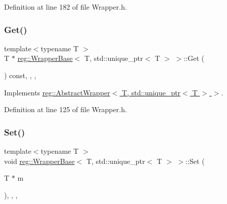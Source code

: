 Definition at line 182 of file Wrapper.\+h.

\mbox{\label{structreg_1_1_wrapper_base_3_01_t_00_01std_1_1unique__ptr_3_01_t_01_4_01_4_a9f4701d60f0dee6b61ae4046633f3ebe}} 
\subsubsection{\texorpdfstring{Get()}{Get()}}
{\footnotesize\ttfamily template$<$typename T $>$ \\
T $\ast$ \hyperlink{structreg_1_1_wrapper_base}{reg\+::\+Wrapper\+Base}$<$ T, std\+::unique\+\_\+ptr$<$ T $>$ $>$\+::Get (\begin{DoxyParamCaption}{ }\end{DoxyParamCaption}) const\hspace{0.3cm}{\ttfamily [inline]}, {\ttfamily [override]}, {\ttfamily [virtual]}, {\ttfamily [noexcept]}}



Implements \hyperlink{structreg_1_1_abstract_wrapper_a88e7079432573b09a5cd695be34e9147}{reg\+::\+Abstract\+Wrapper$<$ T, std\+::unique\+\_\+ptr$<$ T $>$ $>$}.



Definition at line 125 of file Wrapper.\+h.

\mbox{\label{structreg_1_1_wrapper_base_3_01_t_00_01std_1_1unique__ptr_3_01_t_01_4_01_4_a280dc1e6a85e2a95eaa849a45169942f}} 
\subsubsection{\texorpdfstring{Set()}{Set()}}
{\footnotesize\ttfamily template$<$typename T $>$ \\
void \hyperlink{structreg_1_1_wrapper_base}{reg\+::\+Wrapper\+Base}$<$ T, std\+::unique\+\_\+ptr$<$ T $>$ $>$\+::Set (\begin{DoxyParamCaption}\item[{T $\ast$}]{m }\end{DoxyParamCaption})\hspace{0.3cm}{\ttfamily [inline]}, {\ttfamily [override]}, {\ttfamily [virtual]}, {\ttfamily [noexcept]}}



